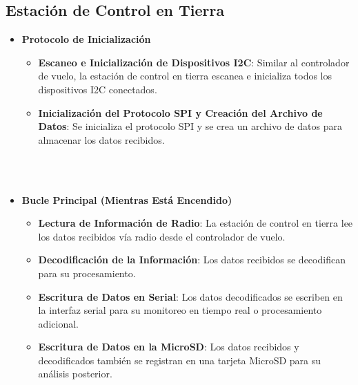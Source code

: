 \subsection{Estación de Control en Tierra}

\begin{itemize}
    \item \textbf{Protocolo de Inicialización}
    \begin{itemize}
        \item \textbf{Escaneo e Inicialización de Dispositivos I2C}: Similar al controlador de vuelo, la estación de control en tierra escanea e inicializa todos los dispositivos I2C conectados.
        \item \textbf{Inicialización del Protocolo SPI y Creación del Archivo de Datos}: Se inicializa el protocolo SPI y se crea un archivo de datos para almacenar los datos recibidos.
    \end{itemize}
    \\  \\ 
    \item \textbf{Bucle Principal (Mientras Está Encendido)}
    \begin{itemize}
        \item \textbf{Lectura de Información de Radio}: La estación de control en tierra lee los datos recibidos vía radio desde el controlador de vuelo.
        \item \textbf{Decodificación de la Información}: Los datos recibidos se decodifican para su procesamiento.
        \item \textbf{Escritura de Datos en Serial}: Los datos decodificados se escriben en la interfaz serial para su monitoreo en tiempo real o procesamiento adicional.
        \item \textbf{Escritura de Datos en la MicroSD}: Los datos recibidos y decodificados también se registran en una tarjeta MicroSD para su análisis posterior.
    \end{itemize}
\end{itemize}
